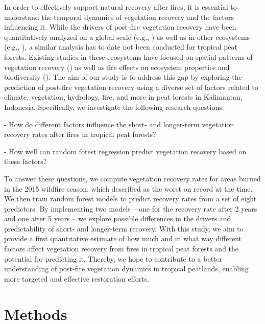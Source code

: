 \documentclass[
  fontsize=12pt,
  paper=a4,
  parskip=half,
  headings=big,
  DIV=12
]{scrreprt}
\begin{document}
In order to effectively support natural recovery after fires, it is essential to understand the temporal dynamics of vegetation recovery and the factors influencing it. While the drivers of post-fire vegetation recovery have been quantitatively analyzed on a global scale (e.g., \cite{xu_global_2024}) as well as in other ecosystems (e.g., \cite{adagbasa_development_2020, joao_indicator-based_2018}), a similar analysis has to date not been conducted for tropical peat forests. Existing studies in these ecosystems have focused on spatial patterns of vegetation recovery (\cite{setiawan_spatio-temporal_2025}) as well as fire effects on ecosystem properties and biodiversity (\cite{harrison_impacts_2024}). The aim of our study is to address this gap by exploring the prediction of post-fire vegetation recovery using a diverse set of factors related to climate, vegetation, hydrology, fire, and more in peat forests in Kalimantan, Indonesia. Specifically, we investigate the following research questions:

- How do different factors influence the short- and longer-term vegetation recovery rates after fires in tropical peat forests?

- How well can random forest regression predict vegetation recovery based on these factors?

To answer these questions, we compute vegetation recovery rates for areas burned in the 2015 wildfire season, which \textcite{grosvenor_catastrophic_2024} described as the worst on record at the time. We then train random forest models to predict recovery rates from a set of eight predictors. By implementing two models -- one for the recovery rate after 2 years and one after 5 years -- we  explore possible differences in the drivers and predictability of short- and longer-term recovery. With this study, we aim to provide a first quantitative estimate of how much and in what way different factors affect vegetation recovery from fires in tropical peat forests and the potential for predicting it.
Thereby, we hope to contribute to a better understanding of post-fire vegetation dynamics in tropical peatlands, enabling more targeted and effective restoration efforts.

\chapter{Methods}
\end{document}
